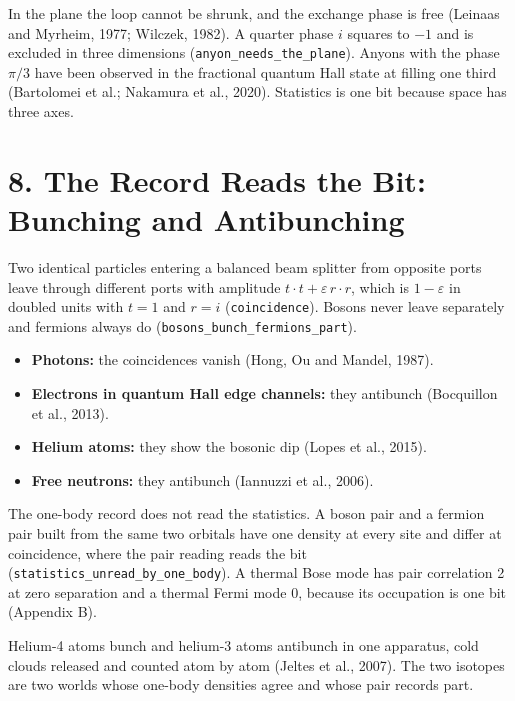 \documentclass[10pt]{article}
\providecommand{\tightlist}{\setlength{\itemsep}{0pt}\setlength{\parskip}{0pt}}
\begin{document}
In the plane the loop cannot be shrunk, and the exchange phase is free
(Leinaas and Myrheim, 1977; Wilczek, 1982). A quarter phase \(i\)
squares to \(-1\) and is excluded in three dimensions
(\texttt{anyon\_needs\_the\_plane}). Anyons with the phase \(\pi/3\)
have been observed in the fractional quantum Hall state at filling one
third (Bartolomei et al.; Nakamura et al., 2020). Statistics is one bit
because space has three axes.

\hypertarget{the-record-reads-the-bit-bunching-and-antibunching}{%
\section{8. The Record Reads the Bit: Bunching and
Antibunching}\label{the-record-reads-the-bit-bunching-and-antibunching}}

Two identical particles entering a balanced beam splitter from opposite
ports leave through different ports with amplitude
\(t\cdot t+\varepsilon\,r\cdot r\), which is \(1-\varepsilon\) in
doubled units with \(t=1\) and \(r=i\) (\texttt{coincidence}). Bosons
never leave separately and fermions always do
(\texttt{bosons\_bunch\_fermions\_part}).

\begin{itemize}
\tightlist
\item
  \textbf{Photons:} the coincidences vanish (Hong, Ou and Mandel, 1987).
\item
  \textbf{Electrons in quantum Hall edge channels:} they antibunch
  (Bocquillon et al., 2013).
\item
  \textbf{Helium atoms:} they show the bosonic dip (Lopes et al., 2015).
\item
  \textbf{Free neutrons:} they antibunch (Iannuzzi et al., 2006).
\end{itemize}

The one-body record does not read the statistics. A boson pair and a
fermion pair built from the same two orbitals have one density at every
site and differ at coincidence, where the pair reading reads the bit
(\texttt{statistics\_unread\_by\_one\_body}). A thermal Bose mode has
pair correlation 2 at zero separation and a thermal Fermi mode 0,
because its occupation is one bit (Appendix B).

Helium-4 atoms bunch and helium-3 atoms antibunch in one apparatus, cold
clouds released and counted atom by atom (Jeltes et al., 2007). The two
isotopes are two worlds whose one-body densities agree and whose pair
records part.
\end{document}
